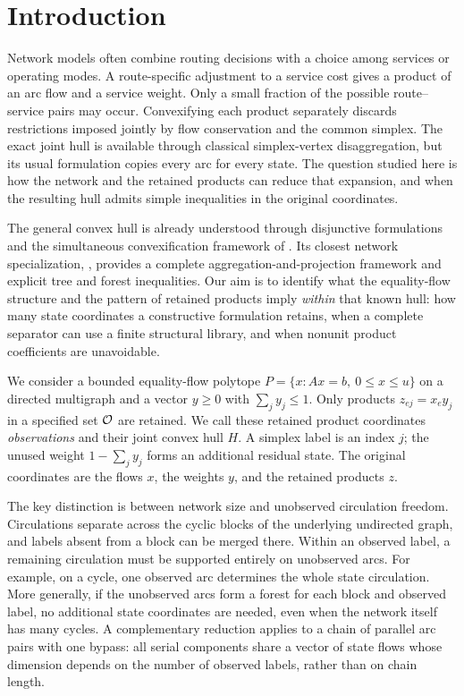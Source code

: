 \section{Introduction}\label{sec:introduction}
Network models often combine routing decisions with a choice among services
or operating modes. A route-specific adjustment to a service cost gives a
product of an arc flow and a service weight. Only a small fraction of the
possible route--service pairs may occur. Convexifying each product separately
discards restrictions imposed jointly by flow conservation and the common
simplex. The exact joint hull is available through classical simplex-vertex
disaggregation, but its usual formulation copies every arc for every state.
The question studied here is how the network and the retained products can
reduce that expansion, and when the resulting hull admits simple inequalities
in the original coordinates.

The general convex hull is already understood through disjunctive
formulations and the simultaneous convexification framework of
\citet{DavarniaRichardTawarmalani2017}. Its closest network specialization,
\citet{KhademniaDavarnia2025}, provides a complete aggregation-and-projection
framework and explicit tree and forest inequalities. Our aim is to identify
what the equality-flow structure and the pattern of retained products imply
\emph{within} that known hull: how many state coordinates a constructive
formulation retains, when a complete separator can use a finite structural
library, and when nonunit product coefficients are unavoidable.

We consider a bounded equality-flow polytope
$P=\{x:Ax=b,\ 0\le x\le u\}$ on a directed multigraph and a vector
$y\ge0$ with $\sum_jy_j\le1$. Only products $z_{ej}=x_e y_j$ in a
specified set $\mathcal O$ are retained. We call these retained product coordinates \emph{observations}
and their joint convex hull $H$. A simplex label is an index $j$;
the unused weight $1-\sum_jy_j$ forms an additional residual state.
The original coordinates are the flows $x$, the weights $y$, and the retained
products $z$.

The key distinction is between network size and unobserved circulation
freedom. Circulations separate across the cyclic blocks of the underlying
undirected graph, and labels absent from a block can be merged there. Within
an observed label, a remaining circulation must be supported entirely on
unobserved arcs. For example, on a cycle, one observed arc determines the
whole state circulation. More generally, if the unobserved arcs form a forest
for each block and observed label, no additional state coordinates are
needed, even when the network itself has many cycles. A complementary
reduction applies to a chain of parallel arc pairs with one bypass: all
serial components share a vector of state flows whose dimension depends on
the number of observed labels, rather than on chain length.

